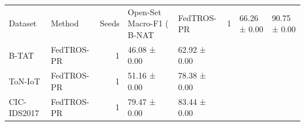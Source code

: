 \begin{tabular}{llrll}
\toprule
Dataset & Method & Seeds & Open-Set Macro-F1 (%
\midrule
B-NAT & FedTROS-PR & 1 & 66.26 ± 0.00 & 90.75 ± 0.00 \\
B-TAT & FedTROS-PR & 1 & 46.08 ± 0.00 & 62.92 ± 0.00 \\
ToN-IoT & FedTROS-PR & 1 & 51.16 ± 0.00 & 78.38 ± 0.00 \\
CIC-IDS2017 & FedTROS-PR & 1 & 79.47 ± 0.00 & 83.44 ± 0.00 \\
\bottomrule
\end{tabular}
